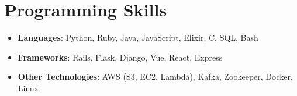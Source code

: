 \documentclass[letterpaper,11pt]{article}
\newcommand{\resumeItem}[2]{
  \item\small{
    \textbf{#1}{: #2 \vspace{-2pt}}
  }
}
\newcommand{\resumeSubItem}[2]{\resumeItem{#1}{#2}\vspace{-4pt}}
\newcommand{\resumeSubHeadingListStart}{\begin{itemize}[leftmargin=*]}
\newcommand{\resumeSubHeadingListEnd}{\end{itemize}}
\begin{document}
%
\section{Programming Skills}
  \resumeSubHeadingListStart
    \resumeSubItem{Languages}{Python, Ruby, Java, JavaScript, Elixir, C, SQL, Bash}
    \resumeSubItem {Frameworks}{Rails, Flask, Django, Vue, React, Express}
    \resumeSubItem {Other Technologies}{AWS (S3, EC2, Lambda), Kafka, Zookeeper, Docker, Linux}
  \resumeSubHeadingListEnd


\end{document}
